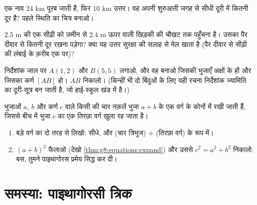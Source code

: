 \begin{exercise}[$\star\star$]\label{exo:g8:pythagoras:8}
एक नाव $24$ km पूरब जाती है, फिर $10$ km उत्तर। वह अपनी शुरुआती जगह
से सीधी दूरी में कितनी दूर है? पहले स्थिति का चित्र बनाओ।
\end{exercise}

\begin{exercise}[$\star\star$]\label{exo:g8:pythagoras:9}
$2.5$ m की एक सीढ़ी को ज़मीन से $2.4$ m ऊपर वाली खिड़की की चौखट तक
पहुँचना है। उसका पैर दीवार से कितनी दूर रखना पड़ेगा? क्या यह उत्तर
सुरक्षा की सलाह से मेल खाता है (पैर दीवार से सीढ़ी की लंबाई के क़रीब
एक  पर)?
\end{exercise}

\begin{exercise}[$\star\star$]\label{exo:g8:pythagoras:10}
निर्देशांक जाल पर $A(1, 2)$ और $B(5, 5)$ लगाओ, और वह 
बनाओ जिसकी  भुजाएँ अक्षों के  हों और जिसका कर्ण $[AB]$
हो। $AB$ निकालो। (किन्हीं भी दो बिंदुओं के लिए यही रचना निर्देशांक
ज्यामिति का दूरी-सूत्र बन जाती है, जो हाई-स्कूल खंड में है।)
\end{exercise}

\begin{exercise}[$\star\star\star$]\label{exo:g8:pythagoras:11}
 भुजाओं $a$, $b$ और कर्ण $c$ वाले किसी  की चार
नक़लें भुजा $a + b$ के एक वर्ग के कोनों में रखी जाती हैं, जिससे बीच
में भुजा $c$ का एक तिरछा वर्ग खुला रह जाता है।
\begin{enumerate}
  \item बड़े वर्ग का  दो तरह से लिखो: सीधे, और (चार
        त्रिभुज) $+$ (तिरछा वर्ग) के रूप में।
  \item $(a + b)^2$ फैलाओ (देखो \cref{thm:g8:equations:expand}) और
        उससे $c^2 = a^2 + b^2$ निकालो: बस, तुमने पाइथागोरस प्रमेय
        सिद्ध कर दी।
\end{enumerate}
\end{exercise}

\section{समस्या: पाइथागोरसी त्रिक}

